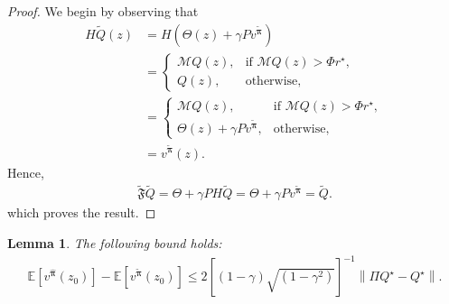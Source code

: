 \documentclass{article}
\newtheorem{lemma}{Lemma}
\begin{document}
\begin{proof}
We begin by observing that
\begin{align*}
H\tilde{Q}(z)&=H\left(\Theta(z)+\gamma Pv^{\boldsymbol{\tilde{\pi}}}\right)    
\\&= \begin{cases}
			\mathcal{M}Q(z), & \text{if $\mathcal{M}Q(z)>\Phi r^\star,$}\\
            Q(z), & \text{otherwise},
		 \end{cases}
\\&= \begin{cases}
			\mathcal{M}Q(z), & \text{if $\mathcal{M}Q(z)>\Phi r^\star,$}\\
            \Theta(z)+\gamma Pv^{\boldsymbol{\tilde{\pi}}}, & \text{otherwise},
		 \end{cases}
\\&=v^{\boldsymbol{\tilde{\pi}}}(z).
\end{align*}
Hence,
\begin{align}
    \tilde{\mathfrak{F}}\tilde{Q}=\Theta+\gamma PH\tilde{Q}=\Theta+\gamma Pv^{\boldsymbol{\tilde{\pi}}}=\tilde{Q}. 
\end{align}
which proves the result.
\end{proof}
\begin{lemma}\label{value_difference_Q_difference}
The following bound holds:
\begin{align}
    \mathbb{E}\left[v^{\boldsymbol{\hat{\pi}}}(z_0)\right]-\mathbb{E}\left[v^{\boldsymbol{\tilde{\pi}}}(z_0)\right]\leq 2\left[(1-\gamma)\sqrt{(1-\gamma^2)}\right]^{-1}\left\|\Pi Q^\star -Q^\star\right\|.
\label{F_tilde_fixed_point}\end{align}
\end{lemma}
\end{document}

